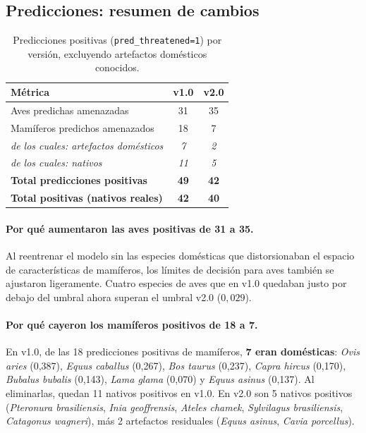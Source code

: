 \documentclass[12pt,a4paper]{article}
\newcommand{\celplus}[1]{\cellcolor{verdeClaro}#1}   %
\newcommand{\celneutro}[1]{\cellcolor{ambarClaro}#1} %
\begin{document}
\subsection{Predicciones: resumen de cambios}

\begin{table}[H]
  \centering
  \caption{Predicciones positivas (\texttt{pred\_threatened=1}) por versión, excluyendo
           artefactos domésticos conocidos.}
  \label{tab:pred_comp}
  \begin{tabular}{lcc}
    \toprule
    \textbf{Métrica} & \textbf{v1.0} & \textbf{v2.0} \\
    \midrule
    Aves predichas amenazadas & 31 & \celneutro{35} \\
    Mamíferos predichos amenazados & 18 & \celneutro{7} \\
    \quad \textit{de los cuales: artefactos domésticos} & \textit{7} & \textit{2} \\
    \quad \textit{de los cuales: nativos} & \textit{11} & \textit{5} \\
    \textbf{Total predicciones positivas} & \textbf{49} & \textbf{42} \\
    \textbf{Total positivas (nativos reales)} & \textbf{42} & \celplus{\textbf{40}} \\
    \bottomrule
  \end{tabular}
\end{table}

\paragraph{Por qué aumentaron las aves positivas de 31 a 35.}
Al reentrenar el modelo sin las especies domésticas que distorsionaban el espacio de
características de mamíferos, los límites de decisión para aves también se ajustaron
ligeramente.  Cuatro especies de aves que en v1.0 quedaban justo por debajo del umbral
ahora superan el umbral v2.0 ($0{,}029$).

\paragraph{Por qué cayeron los mamíferos positivos de 18 a 7.}
En v1.0, de las 18 predicciones positivas de mamíferos, \textbf{7 eran domésticas}:
\textit{Ovis aries} (0,387), \textit{Equus caballus} (0,267), \textit{Bos taurus} (0,237),
\textit{Capra hircus} (0,170), \textit{Bubalus bubalis} (0,143), \textit{Lama glama} (0,070)
y \textit{Equus asinus} (0,137).  Al eliminarlas, quedan 11 nativos positivos en v1.0.
En v2.0 son 5 nativos positivos (\textit{Pteronura brasiliensis}, \textit{Inia geoffrensis},
\textit{Ateles chamek}, \textit{Sylvilagus brasiliensis}, \textit{Catagonus wagneri}),
más 2 artefactos residuales (\textit{Equus asinus}, \textit{Cavia porcellus}).
\end{document}
